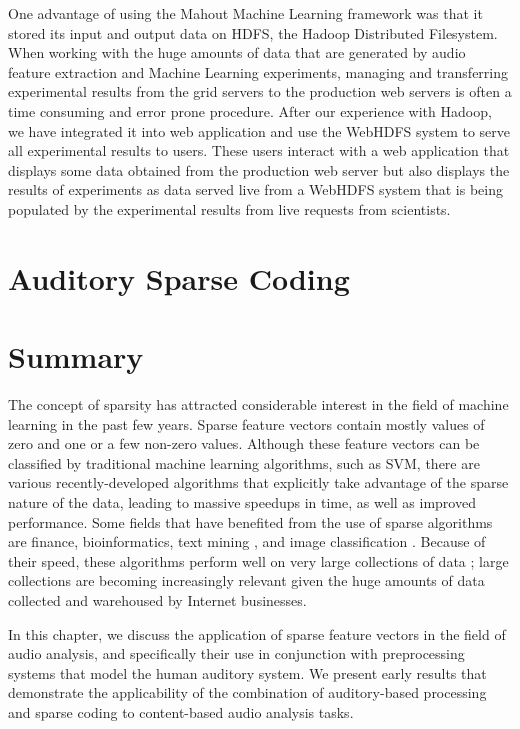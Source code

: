 One advantage of using the Mahout Machine Learning framework was that
it stored its input and output data on HDFS, the Hadoop Distributed
Filesystem.  When working with the huge amounts of data that are
generated by audio feature extraction and Machine Learning
experiments, managing and transferring experimental results from the
grid servers to the production web servers is often a time consuming
and error prone procedure.  After our experience with Hadoop, we have
integrated it into web application and use the WebHDFS system to serve
all experimental results to users.  These users interact with a web
application that displays some data obtained from the production web
server but also displays the results of experiments as data served
live from a WebHDFS system that is being populated by the experimental
results from live requests from scientists.





\section{Auditory Sparse Coding}

\section{Summary}

The concept of sparsity has attracted considerable interest in the
field of machine learning in the past few years.  Sparse feature
vectors contain mostly values of zero and one or a few non-zero
values.  Although these feature vectors can be classified by
traditional machine learning algorithms, such as SVM, there are various
recently-developed algorithms that explicitly take advantage of
the sparse nature of the data, leading to massive speedups in time, as
well as improved performance.  Some fields that have benefited from
the use of sparse algorithms are finance, bioinformatics, text mining
\cite{balakrishnan2008}, and image classification \cite{chechik2010}.
Because of their speed, these algorithms perform well on very large
collections of data \cite{bottou2007}; large collections are becoming 
increasingly relevant given the huge amounts of data collected and warehoused 
by Internet businesses.

In this chapter, we discuss the application of sparse feature vectors
in the field of audio analysis, and specifically their use in conjunction with 
preprocessing systems that model the human auditory system. We present early
results that demonstrate the applicability of the combination of 
auditory-based processing and sparse coding to content-based audio analysis 
tasks.

